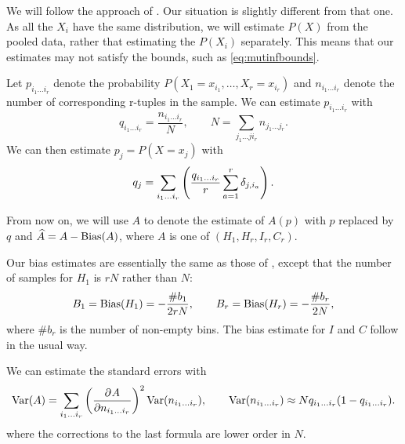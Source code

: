\documentclass[12pt]{article}
\begin{document}
We will follow the approach of \cite{1999PhyD..125..285R}. Our situation is slightly different from that one. As all the $X_i$ have the same distribution, we will estimate $P(X)$ from the pooled data, rather that estimating the $P(X_i)$ separately. This means that our estimates may not satisfy the bounds, such as \eqref{eq:mutinfbounds}.

Let $p_{i_1\ldots i_r}$ denote the probability $P(X_1=x_{i_1},\ldots,X_r=x_{i_r})$ and $n_{i_1\ldots i_r}$ denote the number of corresponding r-tuples in the sample. We can estimate $p_{i_1\ldots i_r}$ with
%
\begin{equation}\label{eq:tupprob}
  q_{i_1\ldots i_r} = \frac{n_{i_1\ldots i_r}}{N},
  \qquad
  N = \sum_{j_1\ldots ji_r} n_{j_1\ldots j_r}.
\end{equation}
%
We can then estimate $p_{j}=P(X=x_{j})$ with
%
\begin{equation}\label{eq:singprob}
  q_j = \sum_{i_1\ldots i_r}\left (  \frac{q_{i_1\ldots i_r}}{r} \sum_{a=1}^r \delta_{j,i_a} \right ).
\end{equation}
%

From now on, we will use $A$ to denote the estimate of $A(p)$ with $p$ replaced by $q$ and $\widehat{A}=A-\operatorname{Bias}(A)$, where $A$ is one of $(H_1,H_r,I_r,C_r)$.

Our bias estimates are essentially the same as those of \cite{1999PhyD..125..285R}, except that the number of samples for $H_1$ is $rN$ rather than $N$:
%
\begin{equation}\label{eq:biasH}
  B_1 = \operatorname{Bias}(H_1) = -\frac{\#b_1}{2rN},
  \qquad
  B_r = \operatorname{Bias}(H_r) = -\frac{\#b_r}{2N},
\end{equation}
%
where $\#b_r$ is the number of non-empty bins. The bias estimate for $I$ and $C$ follow in the usual way.

We can estimate the standard errors with
%
\begin{equation}\label{eq:stderr}
  \var(A) = \sum_{i_1\ldots i_r} \prn{\pdiff{A}{n_{i_1\ldots i_r}}}^2 \var(n_{i_1\ldots i_r}),
  \qquad
  \var(n_{i_1\ldots i_r}) \approx N q_{i_1\ldots i_r}(1-q_{i_1\ldots i_r}).
\end{equation}
%
where the corrections to the last formula are lower order in $N$.
\end{document}
